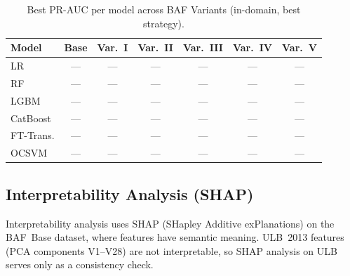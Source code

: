 \begin{table}[ht]
\centering
\caption{Best PR-AUC per model across BAF Variants (in-domain, best strategy).}
\label{tab:baf_variants_summary}
\begin{tabular}{l c c c c c c}
\toprule
Model & Base & Var.~I & Var.~II & Var.~III & Var.~IV & Var.~V \\
\midrule
LR        & --- & --- & --- & --- & --- & --- \\
RF        & --- & --- & --- & --- & --- & --- \\
LGBM      & --- & --- & --- & --- & --- & --- \\
CatBoost  & --- & --- & --- & --- & --- & --- \\
FT-Trans. & --- & --- & --- & --- & --- & --- \\
OCSVM     & --- & --- & --- & --- & --- & --- \\
\bottomrule
\end{tabular}
\end{table}




\subsection{Interpretability Analysis (SHAP)}
\label{sec:shap_results}

Interpretability analysis uses SHAP (SHapley Additive exPlanations)
on the BAF~Base dataset, where features have semantic meaning.
ULB~2013 features (PCA components V1--V28) are not interpretable,
so SHAP analysis on ULB serves only as a consistency check.

